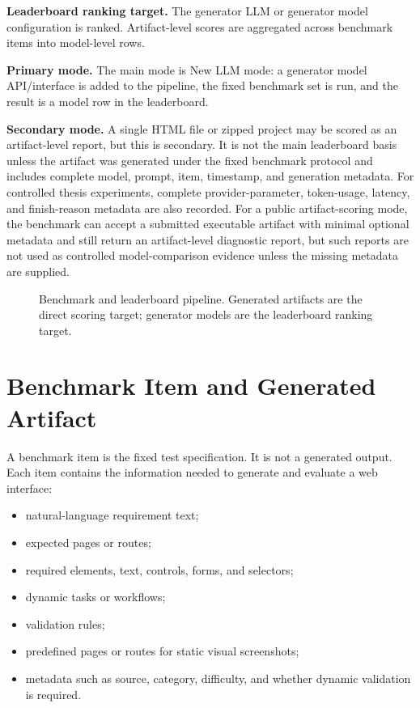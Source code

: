 \textbf{Leaderboard ranking target.} The generator LLM or generator model
configuration is ranked. Artifact-level scores are aggregated across benchmark
items into model-level rows.

\textbf{Primary mode.} The main mode is New LLM mode: a generator model
API/interface is added to the pipeline, the fixed benchmark set is run, and the
result is a model row in the leaderboard.

\textbf{Secondary mode.} A single HTML file or zipped project may be scored as
an artifact-level report, but this is secondary. It is not the main leaderboard
basis unless the artifact was generated under the fixed benchmark protocol and
includes complete model, prompt, item, timestamp, and generation metadata. For
controlled thesis experiments, complete provider-parameter, token-usage,
latency, and finish-reason metadata are also recorded. For a public
artifact-scoring mode, the benchmark can accept a submitted executable artifact
with minimal optional metadata and still return an artifact-level diagnostic
report, but such reports are not used as controlled model-comparison evidence
unless the missing metadata are supplied.

\begin{figure}[t]
  \centering
  \caption{Benchmark and leaderboard pipeline. Generated artifacts are the
  direct scoring target; generator models are the leaderboard ranking target.}
  \label{fig:pipeline}
\end{figure}

\section{Benchmark Item and Generated Artifact}
\label{sec:item-artifact}

A benchmark item is the fixed test specification. It is not a generated output.
Each item contains the information needed to generate and evaluate a web
interface:

\begin{itemize}
  \item natural-language requirement text;
  \item expected pages or routes;
  \item required elements, text, controls, forms, and selectors;
  \item dynamic tasks or workflows;
  \item validation rules;
  \item predefined pages or routes for static visual screenshots;
  \item metadata such as source, category, difficulty, and whether dynamic
  validation is required.
\end{itemize}

